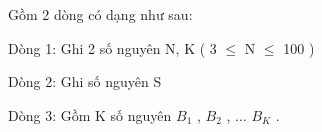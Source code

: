 Gồm 2 dòng có dạng như sau:  

   Dòng 1: Ghi 2 số nguyên N, K ( 3  $\le$  N  $\le$  100 )  

   Dòng 2: Ghi số nguyên S  

   Dòng 3: Gồm K số nguyên $B_{1}$   , $B_{2}$   , ... $B_{K}$   .